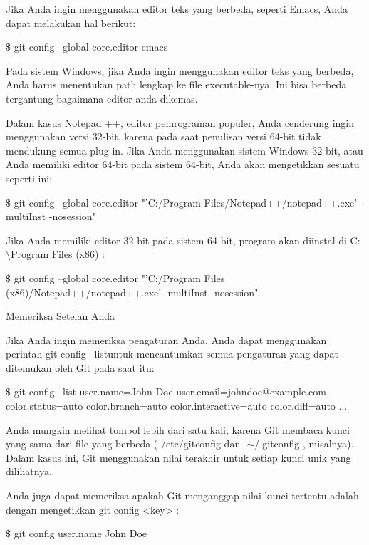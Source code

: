 \vspace{12pt}
\noindent 
Jika Anda ingin menggunakan editor teks yang berbeda, seperti Emacs, Anda dapat melakukan hal berikut: \par
\vspace{12pt}
\noindent 
  $  \$  $ git config --global core.editor emacs  \par
\vspace{12pt}
\noindent 
Pada sistem Windows, jika Anda ingin menggunakan editor teks yang berbeda, Anda harus menentukan path lengkap ke file executable-nya. $  $Ini bisa berbeda tergantung bagaimana editor anda dikemas. \par
\vspace{12pt}
\noindent 
Dalam kasus Notepad ++, editor pemrograman populer, Anda cenderung ingin menggunakan versi 32-bit, karena pada saat penulisan versi 64-bit tidak mendukung semua plug-in. $  $Jika Anda menggunakan sistem Windows 32-bit, atau Anda memiliki editor 64-bit pada sistem 64-bit, Anda akan mengetikkan sesuatu seperti ini: \par
\vspace{12pt}
\noindent 
  $  \$  $ git config --global core.editor "'C:/Program Files/Notepad++/notepad++.exe' -multiInst -nosession"  \par
\vspace{12pt}
\noindent 
Jika Anda memiliki editor 32 bit pada sistem 64-bit, program akan diinstal di $  $C: $  \setminus  $Program Files (x86) $  $: \par
\vspace{12pt}
\noindent 
  $  \$  $ git config --global core.editor "'C:/Program Files (x86)/Notepad++/notepad++.exe' -multiInst -nosession"  \par
\noindent 
Memeriksa Setelan Anda \par
\vspace{12pt}
\noindent 
Jika Anda ingin memeriksa pengaturan Anda, Anda dapat menggunakan perintah $  $git config --listuntuk mencantumkan semua pengaturan yang dapat ditemukan oleh Git pada saat itu: \par
\vspace{12pt}
\noindent 
  $  \$  $ git config --list user.name=John Doe user.email=johndoe@example.com color.status=auto color.branch=auto color.interactive=auto color.diff=auto ...  \par
\vspace{12pt}
\noindent 
Anda mungkin melihat tombol lebih dari satu kali, karena Git membaca kunci yang sama dari file yang berbeda ( $  $/etc/gitconfig $  $dan $  $ $  \sim  $/.gitconfig $  $, misalnya). $  $Dalam kasus ini, Git menggunakan nilai terakhir untuk setiap kunci unik yang dilihatnya. \par
\vspace{12pt}
\noindent 
Anda juga dapat memeriksa apakah Git menganggap nilai kunci tertentu adalah dengan mengetikkan $  $git config <key> $  $: \par
\vspace{12pt}
\noindent 
  $  \$  $ git config user.name John Doe  \par
\vspace{12pt}
\vspace{12pt}
\vspace{12pt}

